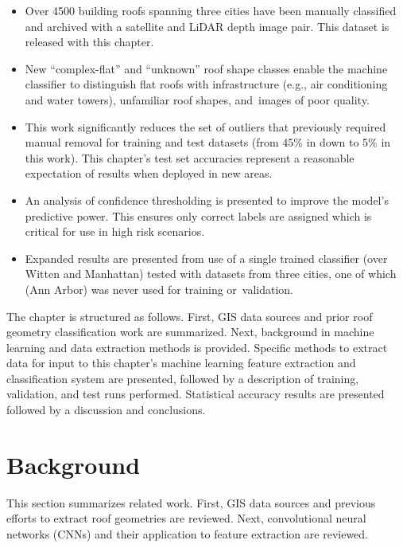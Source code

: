 \begin{itemize}
    \item Over 4500 building roofs spanning three cities have been manually classified and archived with a satellite and LiDAR depth image pair. This dataset is released with this chapter.%
    \item New ``complex-flat'' and ``unknown'' roof shape classes enable the machine classifier to distinguish flat roofs with infrastructure (e.g., air conditioning and water towers), unfamiliar roof shapes, and~images of poor quality.
    \item This work significantly reduces the set of outliers that previously required manual removal for training and test datasets (from 45\% in \cite{castagno_automatic_2018} down to 5\% in this work). This chapter's test set accuracies represent a reasonable expectation of results when deployed in new areas.
    \item An analysis of confidence thresholding is presented to improve the model's predictive power. This ensures only correct labels are assigned which is critical for use in high risk scenarios. 
    \item Expanded results are presented from use of a single trained classifier (over Witten and Manhattan) tested with datasets from three cities, one of which (Ann Arbor) was never used for training or~validation.
\end{itemize}

The chapter is structured as follows.  First, GIS data sources and prior roof geometry classification work are summarized.  Next, background in machine learning and data extraction methods is provided.  Specific methods to extract data for input to this chapter's machine learning feature extraction and classification system are presented, followed by a description of training, validation, and test runs performed.  Statistical accuracy results are presented followed by a discussion and conclusions.

 
\section{Background}
This section summarizes related work. First, GIS data sources and previous efforts to extract roof geometries are reviewed.  Next, convolutional neural networks (CNNs) and their application to feature extraction are reviewed.
